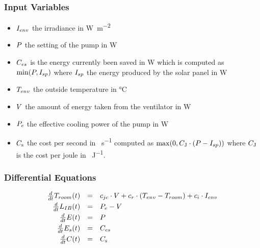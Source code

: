 \subsubsection{Input Variables}
\begin{itemize}
\item
  $I_{env}$ the irradiance in \si{\watt\per\square\metre}
\item $P$ the setting of the pump in \si{\watt}
\item $C_{es}$ is the energy currently been saved in \si{\watt}
  which is computed as $\min(P,I_{sp})$ where
  $I_{sp}$ the energy produced by the solar panel in \si{\watt}
\item
  $T_{env}$ the outside temperature in \si{\degreeCelsius}
\item
  $V$ the amount of energy taken from the ventilator in \si{\watt}
\item $P_{e}$ the effective cooling power of the pump in \si{\watt}
\item $C_{\si{\second}}$ the cost per second in \si{\dkk\per\second}
  computed as $\max(0,C_{\si{\joule}}\cdot(P - I_{sp}))$
  where $C_{\si{\joule}}$ is the cost per joule in \si{\dkk\per\joule}.
\end{itemize}




\subsubsection{Differential Equations}

\[
  \begin{array}{rcl}
    \frac{d}{dt}T_{room}(t) &=& c_{jc}\cdot V + c_{r}\cdot(T_{env}-T_{room}) + c_{i}\cdot I_{env} 
    \\[0.1cm]
    \frac{d}{dt}L_{IB}(t) &=&  P_{e} - V
    \\[0.1cm]
    \frac{d}{dt}E(t) &=&  P
    \\[0.1cm]
    \frac{d}{dt}E_{s}(t) &=&  C_{es}
    \\[0.1cm]
    \frac{d}{dt}C(t) &=&  C_{\si{\second}}
  \end{array}
\]

